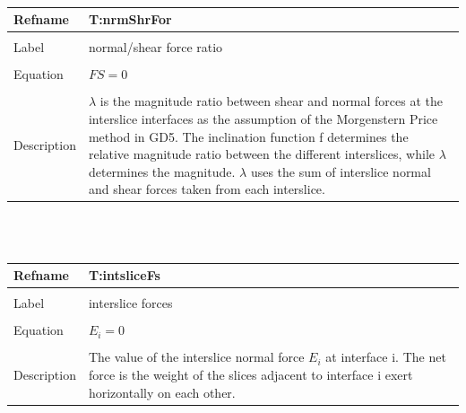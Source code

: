 \documentclass[12pt]{article}
\begin{document}
~\newline
\noindent \begin{minipage}{\textwidth}
\begin{tabular}{p{} p{}}
\toprule \textbf{Refname} & \textbf{T:nrmShrFor}
\label{T:nrmShrFor}
\\ \midrule \\
Label & normal/shear force ratio
\\ \midrule \\
Equation & $FS=0$
\\ \midrule \\
Description & $\lambda{}$ is the magnitude ratio between shear and normal forces at the interslice interfaces as the assumption of the Morgenstern Price method in GD5. The inclination function f determines the relative magnitude ratio between the different interslices, while $\lambda{}$ determines the magnitude. $\lambda{}$ uses the sum of interslice normal and shear forces taken from each interslice.
\\ \bottomrule \end{tabular}
\end{minipage}\\
~\newline
\noindent \begin{minipage}{\textwidth}
\begin{tabular}{p{} p{}}
\toprule \textbf{Refname} & \textbf{T:intsliceFs}
\label{T:intsliceFs}
\\ \midrule \\
Label & interslice forces
\\ \midrule \\
Equation & $E_{i}=0$
\\ \midrule \\
Description & The value of the interslice normal force $E_{i}$ at interface i. The net force is the weight of the slices adjacent to interface i exert horizontally on each other.
\\ \bottomrule \end{tabular}
\end{minipage}\\
~\newline
\end{document}
